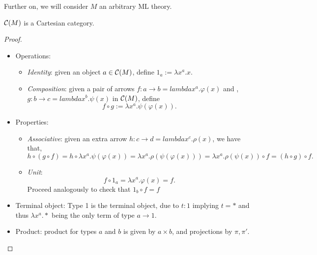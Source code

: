 Further on, we will consider $M$ an arbitrary ML theory.
\begin{proposition}\label{prop:CM1}
  $\mathcal{C}(M)$ is a Cartesian category.
\end{proposition}
\begin{proof}
    \begin{itemize}
  \item Operations:
    \begin{itemize}
      
    \item \emph{Identity}: given an object $a\in \mathcal{C}(M)$, define $1_a := \lambda x^a.x$. 
    \item \emph{Composition}: given a pair of arrows $f:a\to b =  lambda x^a. \varphi(x)$ and , $g:b \to c = lambda x^b. \psi(x)$ in $\mathcal{C}(M)$, define $$f\circ g := \lambda x^a. \psi (\varphi(x)). $$
    \end{itemize}

  \item Properties:
    \begin{itemize}
    \item \emph{Associative}: given an extra arrow $h:c\to d = lambda x^c. \rho(x)$, we have that,
      $$h \circ (g\circ f)  = h\circ \lambda x^a.\psi(\varphi(x))  = \lambda x^a.\rho(\psi(\varphi(x))) =  \lambda x^a.\rho(\psi(x)) \circ f =  (h\circ g)\circ f.$$
    \item \emph{Unit}: 
      $$f \circ 1_a = \lambda x^a. \varphi(x) = f.$$
Proceed analogously to check that $1_b \circ f =f$
    \end{itemize}


\item Terminal object: Type 1 is the terminal object, due to $t: 1$ implying $t=*$ and thus $\lambda x^a. *$ being the only term of type $a\to 1$. 
\item Product:  product for types $a$ and $b$ is given by $a\times b$, and projections by $\pi, \pi'$.
  \end{itemize}
\end{proof}

